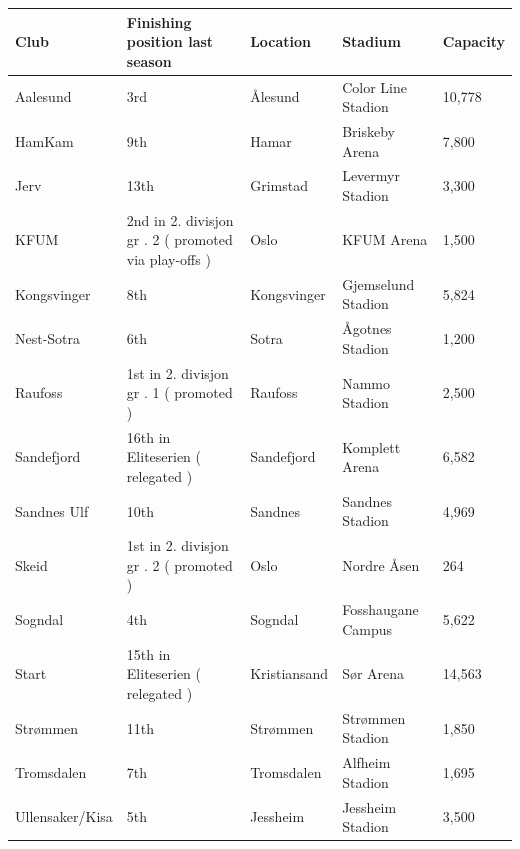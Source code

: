 \documentclass{article}
\begin{document}
\begin{tabular}{lllll}
\toprule
Club & Finishing position last season & Location & Stadium & Capacity \\
\midrule
Aalesund & 3rd & Ålesund & Color Line Stadion & 10,778 \\
HamKam & 9th & Hamar & Briskeby Arena & 7,800 \\
Jerv & 13th & Grimstad & Levermyr Stadion & 3,300 \\
KFUM & 2nd in 2. divisjon gr . 2 ( promoted via play-offs ) & Oslo & KFUM Arena & 1,500 \\
Kongsvinger & 8th & Kongsvinger & Gjemselund Stadion & 5,824 \\
Nest-Sotra & 6th & Sotra & Ågotnes Stadion & 1,200 \\
Raufoss & 1st in 2. divisjon gr . 1 ( promoted ) & Raufoss & Nammo Stadion & 2,500 \\
Sandefjord & 16th in Eliteserien ( relegated ) & Sandefjord & Komplett Arena & 6,582 \\
Sandnes Ulf & 10th & Sandnes & Sandnes Stadion & 4,969 \\
Skeid & 1st in 2. divisjon gr . 2 ( promoted ) & Oslo & Nordre Åsen & 264 \\
Sogndal & 4th & Sogndal & Fosshaugane Campus & 5,622 \\
Start & 15th in Eliteserien ( relegated ) & Kristiansand & Sør Arena & 14,563 \\
Strømmen & 11th & Strømmen & Strømmen Stadion & 1,850 \\
Tromsdalen & 7th & Tromsdalen & Alfheim Stadion & 1,695 \\
Ullensaker/Kisa & 5th & Jessheim & Jessheim Stadion & 3,500 \\
\bottomrule
\end{tabular}
\end{document}
